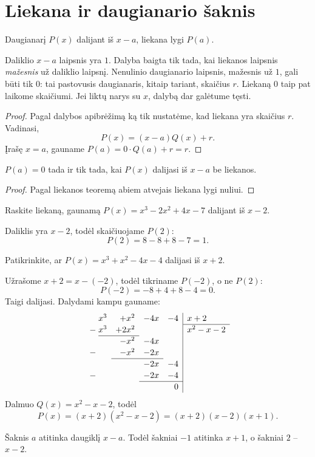 \documentclass[11pt,a4paper]{scrartcl}
\begin{document}
\section{Liekana ir daugianario šaknis}
\begin{theorem}
Daugianarį \(P(x)\) dalijant iš \(x-a\), liekana lygi \(P(a)\).
\end{theorem}
\begin{remark*}
Daliklio \(x-a\) laipsnis yra \(1\). Dalyba baigta tik tada, kai liekanos laipsnis \emph{mažesnis} už daliklio laipsnį. Nenulinio daugianario laipsnis, mažesnis už \(1\), gali būti tik \(0\): tai pastovusis daugianaris, kitaip tariant, skaičius \(r\). Liekaną \(0\) taip pat laikome skaičiumi. Jei liktų narys su \(x\), dalybą dar galėtume tęsti.
\end{remark*}
\begin{proof}
Pagal dalybos apibrėžimą ką tik nustatėme, kad liekana yra skaičius \(r\). Vadinasi,
\[P(x)=(x-a)Q(x)+r.\]
Įrašę \(x=a\), gauname \(P(a)=0\cdot Q(a)+r=r\).
\end{proof}
\begin{corollary}
\(P(a)=0\) tada ir tik tada, kai \(P(x)\) dalijasi iš \(x-a\) be liekanos.
\end{corollary}
\begin{proof}
Pagal liekanos teoremą abiem atvejais liekana lygi nuliui.
\end{proof}
\begin{example}
Raskite liekaną, gaunamą \(P(x)=x^3-2x^2+4x-7\) dalijant iš \(x-2\).
\end{example}
\begin{solution}
Daliklis yra \(x-2\), todėl skaičiuojame \(P(2)\):
\[P(2)=8-8+8-7=1.\]
\end{solution}
\begin{example}[Daliklis \(x+2\)]
Patikrinkite, ar \(P(x)=x^3+x^2-4x-4\) dalijasi iš \(x+2\).
\end{example}
\begin{solution}
Užrašome \(x+2=x-(-2)\), todėl tikriname \(P(-2)\), o ne \(P(2)\):
\[P(-2)=-8+4+8-4=0.\]
Taigi dalijasi. Dalydami kampu gauname:
\[
\renewcommand{\arraystretch}{1.12}
\begin{array}{r@{\;}rrrr|l}
 &x^3&+x^2&-4x&-4&x+2\\\cline{6-6}
 -&x^3&+2x^2&&&x^2-x-2\\\cline{2-3}
 &&-x^2&-4x&&\\
 -&&-x^2&-2x&&\\\cline{3-4}
 &&&-2x&-4&\\
 -&&&-2x&-4&\\\cline{4-5}
 &&&&0&
\end{array}
\]
Dalmuo \(Q(x)=x^2-x-2\), todėl
\[P(x)=(x+2)(x^2-x-2)=(x+2)(x-2)(x+1).\]
\end{solution}
\begin{remark*}
Šaknis \(a\) atitinka daugiklį \(x-a\). Todėl šakniai \(-1\) atitinka \(x+1\), o šakniai \(2\) -- \(x-2\).
\end{remark*}
\end{document}
